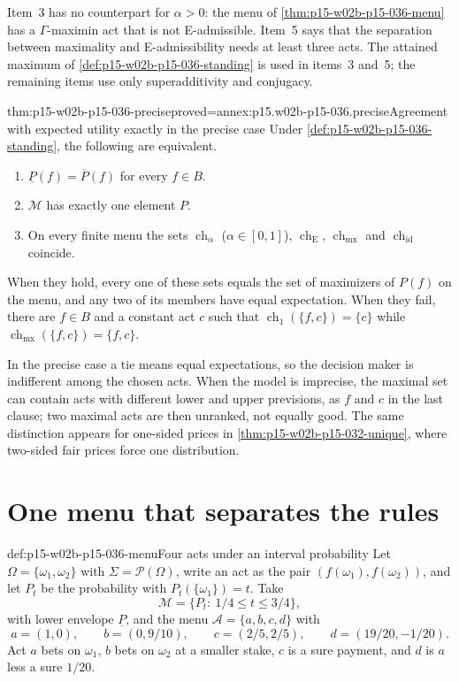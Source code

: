 Item~3 has no counterpart for \(\alpha>0\): the menu of
\cref{thm:p15-w02b-p15-036-menu} has a \(\Gamma\)-maximin act that is not
E-admissible. Item~5 says that the separation between maximality and
E-admissibility needs at least three acts. The attained maximum of
\cref{def:p15-w02b-p15-036-standing} is used in items~3 and~5; the remaining
items use only superadditivity and conjugacy.

\begin{hbtheorem}{thm:p15-w02b-p15-036-precise}{proved=annex:p15.w02b-p15-036.precise}{Agreement with expected utility exactly in the precise case}
Under \cref{def:p15-w02b-p15-036-standing}, the following are equivalent.
\begin{enumerate}
\item \(\underline P(f)=\overline P(f)\) for every \(f\in B\).
\item \(\mathcal M\) has exactly one element \(P\).
\item On every finite menu the sets \(\operatorname{ch}_\alpha\)
 (\(\alpha\in[0,1]\)), \(\operatorname{ch}_{\mathrm E}\),
 \(\operatorname{ch}_{\mathrm{mx}}\) and \(\operatorname{ch}_{\mathrm{id}}\)
 coincide.
\end{enumerate}
When they hold, every one of these sets equals the set of maximizers of
\(P(f)\) on the menu, and any two of its members have equal expectation.
When they fail, there are \(f\in B\) and a constant act \(c\) such that
\(\operatorname{ch}_1(\{f,c\})=\{c\}\) while
\(\operatorname{ch}_{\mathrm{mx}}(\{f,c\})=\{f,c\}\).
\end{hbtheorem}

In the precise case a tie means equal expectations, so the decision maker
is indifferent among the chosen acts. When the model is imprecise, the
maximal set can contain acts with different lower and upper previsions, as
\(f\) and \(c\) in the last clause; two maximal acts are then unranked, not
equally good. The same distinction appears for one-sided prices in
\cref{thm:p15-w02b-p15-032-unique}, where two-sided fair prices force one
distribution.

\section{One menu that separates the rules}
\label{sec:p15-w02b-p15-036-menu}

\begin{hbexample}{def:p15-w02b-p15-036-menu}{Four acts under an interval probability}
Let \(\Omega=\{\omega_1,\omega_2\}\) with \(\Sigma=\mathcal P(\Omega)\),
write an act as the pair \((f(\omega_1),f(\omega_2))\), and let \(P_t\)
be the probability with \(P_t(\{\omega_1\})=t\). Take
\[
 \mathcal M=\{P_t:\ 1/4\leq t\leq3/4\},
\]
with lower envelope \(\underline P\), and the menu
\(\mathcal A=\{a,b,c,d\}\) with
\[
 a=(1,0),\qquad b=(0,9/10),\qquad c=(2/5,2/5),\qquad d=(19/20,-1/20).
\]
Act \(a\) bets on \(\omega_1\), \(b\) bets on \(\omega_2\) at a smaller
stake, \(c\) is a sure payment, and \(d\) is \(a\) less a sure \(1/20\).
\end{hbexample}

